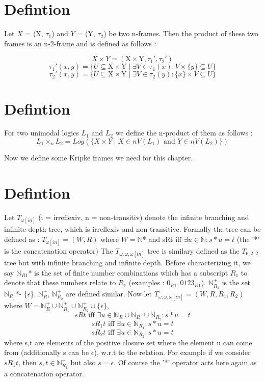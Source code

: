 \documentclass[12pt, a4paper]{scrreprt}
\begin{document}
\section {Defintion}
Let $X$ = (X, $\tau_1$) and $Y$ = (Y, $\tau_2$) be two n-frames. Then the product of these two frames
is an n-2-frame and is defined as follows : \newline

$$ X \times Y = (\mbox{X} \times \mbox{Y}, \tau_1', \tau_2')$$   
$$ \tau_1'(x,y) = \{ U \subseteq \mbox{X} \times \mbox{Y} \mid \exists V \in \tau_1(x) : V \times  \{ y \} \subseteq U \}$$
$$ \tau_2'(x,y) = \{ U \subseteq \mbox{X} \times \mbox{Y} \mid \exists V \in \tau_2(y) : \{ x \} \times V \subseteq U \}$$

\section {Defintion}

For two unimodal logics $L_1$ and $L_2$ we define the n-product of them as follows :
$$ L_1 \times_n L_2 = Log(\{ X \times Y \mid X \in nV(L_1) \mbox{ and } Y \in nV(L_2) \})$$

Now we define some Kripke frames we need for this chapter.


\section{Defintion}
Let $T_{\omega [in]}$ (i = irreflexiv, n = non-transitiv) denote the infinite branching and infinite depth tree, which is irreflexiv and non-transitive.
Formally the tree can be defined as : $T_{\omega [in]} = (W, R)$ where $W = \mathbb{N}$* and sRt iff $\exists u \in \mathbb{N} : s*u = t$ (the '*' is the concatenation operator) \newline \newline
The $T_{\omega,\omega,\omega [in]}$ tree is similary defined as the $T_{6,2,2}$ tree but with infinite branching and infinite depth. Before characterizing it, we say
$\mathbb{N}_{R1}$* is the set of finite number combinations which has a subscript $R_1$ to denote that these numbers relate to $R_1$  \newline 
(examples : $0_{R1}, 0123_{R1}$).
$\mathbb{N}^+_{R_1}$ is the set $\mathbb{N}_{R_1}$*- \{$\epsilon$\}. $\mathbb{N}^+_{R}$, $\mathbb{N}^+_{R_2}$ are defined similar. \newline \newline
Now let $T_{\omega,\omega,\omega [in]} = (W, R, R_1, R_2 )$ where $W = \mathbb{N}^+_{R} \cup \mathbb{N}^+_{R_1} \cup \mathbb{N}^+_{R_2} \cup \{ \epsilon\}$, 
$$sRt \mbox{ iff } \exists u \in \mathbb{N}_{R} \cup \mathbb{N}_{R_1} \cup \mathbb{N}_{R_2} : s*u = t$$
$$sR_1t \mbox { iff } \exists u \in \mathbb{N}_{R_1} : s * u = t$$
$$sR_2t \mbox { iff } \exists u \in \mathbb{N}_{R_2} : s * u = t$$
where s,t are elements of the positive closure set where the element u can come from (additionally s can be $\epsilon$), w.r.t to the relation. For example
if we consider $sR_1t$, then $s,t \in \mathbb{N}^+_{R_1}$ but also $s = \epsilon$. Of course the '*' operator acts here again as a concatenation operator.
\end{document}
